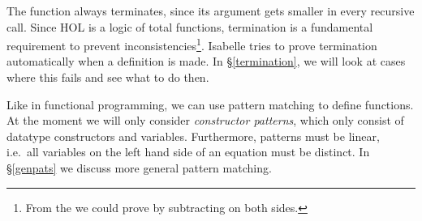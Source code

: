 \begin{isabellebody}
\begin{isamarkuptext}
\end{isamarkuptext}%
\isamarkuptrue%
%
\begin{isamarkuptext}%
The function always terminates, since its argument gets smaller in
  every recursive call. 
  Since HOL is a logic of total functions, termination is a
  fundamental requirement to prevent inconsistencies\footnote{From the
    we could prove 
   by subtracting  on both sides.}.
  Isabelle tries to prove termination automatically when a definition
  is made. In \S\ref{termination}, we will look at cases where this
  fails and see what to do then.%
\end{isamarkuptext}%
\isamarkuptrue%
%
\isamarkuptrue%
%
\begin{isamarkuptext}%
\label{patmatch}
  Like in functional programming, we can use pattern matching to
  define functions. At the moment we will only consider \emph{constructor
  patterns}, which only consist of datatype constructors and
  variables. Furthermore, patterns must be linear, i.e.\ all variables
  on the left hand side of an equation must be distinct. In
  \S\ref{genpats} we discuss more general pattern matching.


\end{isamarkuptext}
\end{isabellebody}
